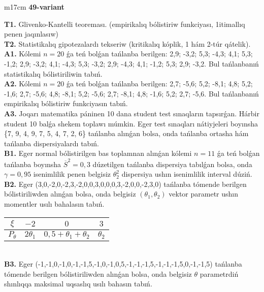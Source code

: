 \documentclass{article}
\begin{document}
\begin{tabular}{m{17cm}}
\textbf{49-variant}
\newline

\textbf{T1.} 
Glivenko-Kantelli teoreması. (empirikalıq bólistiriw funkciyası, 1itimallıq penen jaqınlasıw)
 \\
\textbf{T2.} 
Statistikalıq gipotezalardı tekseriw (kritikalıq kóplik, 1 hám 2-túr qátelik).
 \\
\textbf{A1.} 
Kólemi \(n = 20\) ǵa teń bolǵan tańlanba berilgen: 2,9; -3,2; 5,3; -4,3; 4,1; 5,3; -1,2; 2,9; -3,2; 4,1; -4,3; 5,3; -3,2; 2,9; -4,3; 4,1; -1,2; 5,3; 2,9; -3,2. Bul tańlanbanıń statistikalıq bólistiriliwin tabıń.
 \\
\textbf{A2.} 
Kólemi \(n = 20\) ǵa teń bolǵan tańlanba berilgen: 2,7; -5,6; 5,2; -8,1; 4,8; 5,2; -1,6; 2,7; -5,6; 4,8; -8,1; 5,2; -5,6; 2,7; -8,1; 4,8; -1,6; 5,2; 2,7; -5,6. Bul tańlanbanıń empirikalıq bólistiriw funkciyasın tabıń.
 \\
\textbf{A3.} 
Joqarı matematika páninen 10 dana student test sınaqların tapsırǵan. Hárbir student 10 balǵa shekem toplawı múmkin. Eger test sınaqları nátiyjeleri boyınsha \{7, 9, 4, 9, 7, 5, 4, 7, 2, 6\} tańlanba alınǵan bolsa, onda tańlanba ortasha hám tańlanba dispersiyalardı tabıń.
 \\
\textbf{B1.} 
Eger normal bólistirilgen bas toplamnan alınǵan kólemi \(n = 11\) ǵa teń bolǵan tańlanba boyınsha \({\overline{S}}^{2} = 0,3\) dúzetilgen tańlanba dispersiya tabılǵan bolsa, onda \(\gamma = 0,95\) isenimlilik penen belgisiz \(\theta_{2}^{2}\) dispersiya ushın isenimlilik interval dúziń.
 \\
\textbf{B2.} 
Eger (3,0,-2,0,-2,3,-2,0,0,3,0,0,0,3,-2,0,0,-2,3,0) tańlanba tómende berilgen bólistiriliwden alınǵan bolsa, onda belgisiz \(\left( \theta_{1},\theta_{2} \right)\) vektor parametr ushın momentler usılı bahalasın tabıń.
\begin{tabular}{|c|c|c|c|}
  \hline
$\xi$ &
$- 2$ &
$0$ &
$3$\\
\hline
\(P_{\theta}\) & \({2\theta}_{1}\) & \(0,5 + \theta_{1} + \theta_{2}\) & \(\theta_{2}\) \\
\hline
\end{tabular}
 \\
\textbf{B3.} 
Eger (-1,-1,0,-1,0,-1,-1,5,-1,0,-1,0,5,-1,-1,-1,5,-1,-1,-1,5,0,-1,-1,5) tańlanba tómende berilgen bólistiriliwden alınǵan bolsa, onda belgisiz \(\theta\) parametrdiń shınlıqqa maksimal uqsaslıq usılı bahasın tabıń.
\begin{tabular}{|c|c|c|c|}

\end{tabular}
\end{tabular}
\end{document}
